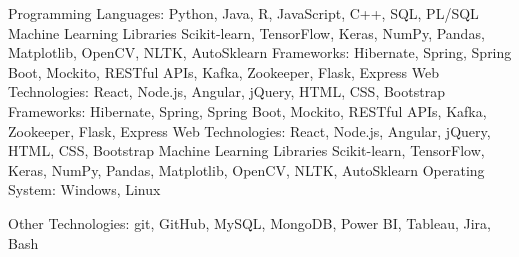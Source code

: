 \begin{cvskills}
  \cvskill
    {Programming Languages:}
    {Python, Java, R, JavaScript,  C++, SQL, PL/SQL}
  {
  \cvskill
    {Machine Learning Libraries}
    {Scikit-learn, TensorFlow, Keras, NumPy, Pandas, Matplotlib, OpenCV, NLTK, AutoSklearn}
  \cvskill
    {Frameworks:}
    {Hibernate, Spring, Spring Boot, Mockito, RESTful APIs, Kafka, Zookeeper, Flask, Express}
  \cvskill
    {Web Technologies:}
    {React, Node.js, Angular, jQuery, HTML, CSS, Bootstrap}
  }
  {
  \cvskill
    {Frameworks:}
    {Hibernate, Spring, Spring Boot, Mockito, RESTful APIs, Kafka, Zookeeper, Flask, Express}
  \cvskill
    {Web Technologies:}
    {React, Node.js, Angular, jQuery, HTML, CSS, Bootstrap}
  \cvskill
    {Machine Learning Libraries}
    {Scikit-learn, TensorFlow, Keras, NumPy, Pandas, Matplotlib, OpenCV, NLTK, AutoSklearn}
  }
  \cvskill
    {Operating System:}
    {Windows,  Linux}
  
    
   
   \cvskill
    {Other Technologies:}
    {git, GitHub, MySQL, MongoDB, Power BI, Tableau, Jira, Bash}
\end{cvskills}